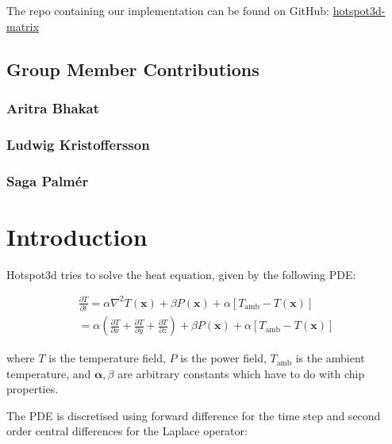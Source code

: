 The repo containing our implementation can be found on GitHub:
\href{https://github.com/arrebarritra/hotspot3d-matrix}{hotspot3d-matrix}

\hypertarget{group-member-contributions}{%
\subsection{Group Member
Contributions}\label{group-member-contributions}}

\hypertarget{aritra-bhakat}{%
\subsubsection{Aritra Bhakat}\label{aritra-bhakat}}

\hypertarget{ludwig-kristoffersson}{%
\subsubsection{Ludwig Kristoffersson}\label{ludwig-kristoffersson}}

\hypertarget{saga-palmuxe9r}{%
\subsubsection{Saga Palmér}\label{saga-palmuxe9r}}

\hypertarget{introduction}{%
\section{Introduction}\label{introduction}}

Hotspot3d tries to solve the heat equation, given by the following PDE:

\begin{align}
    \frac{\partial T}{\partial t} = \alpha \nabla^2 T(\mathbf{x}) + \beta P(\mathbf{x}) + \alpha \left[ T_{\text{amb}} - T(\mathbf{x}) \right] \\
    = \alpha \left( \frac{\partial T}{\partial x} + \frac{\partial T}{\partial y} + \frac{\partial T}{\partial z} \right) + \beta P(\mathbf{x}) + \alpha \left[ T_{\text{amb}} - T(\mathbf{x}) \right]
\end{align}

where \(T\) is the temperature field, \(P\) is the power field,
\(T_{\text{amb}}\) is the ambient temperature, and
\(\mathbf{\alpha}, \beta\) are arbitrary constants which have to do with
chip properties.

The PDE is discretised using forward difference for the time step and
second order central differences for the Laplace operator:


